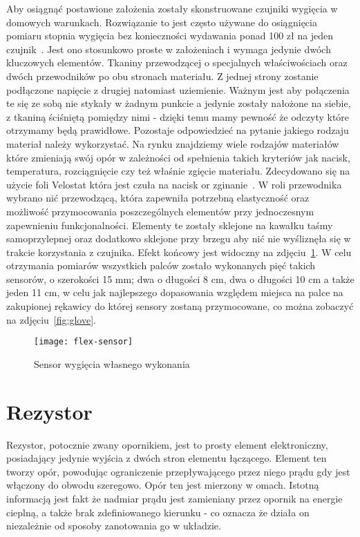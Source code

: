 	Aby osiągnąć postawione założenia zostały skonstruowane czujniki wygięcia w domowych warunkach. Rozwiązanie to jest często używane do osiągnięcia pomiaru stopnia wygięcia bez konieczności wydawania ponad 100 zł na jeden czujnik~\cite{flex-sensor}. Jest ono stosunkowo proste w założeniach i wymaga jedynie dwóch kluczowych elementów. Tkaniny przewodzącej o specjalnych właściwościach oraz dwóch przewodników po obu stronach materiału. Z jednej strony zostanie podłączone napięcie z drugiej natomiast uziemienie. Ważnym jest aby połączenia te się ze sobą nie stykały w żadnym punkcie a jedynie zostały nałożone na siebie, z tkaniną ściśniętą pomiędzy nimi - dzięki temu mamy pewność że odczyty które otrzymamy będą prawidłowe. Pozostaje odpowiedzieć na pytanie jakiego rodzaju materiał należy wykorzystać. Na rynku znajdziemy wiele rodzajów materiałów które zmieniają swój opór w zależności od spełnienia takich kryteriów jak nacisk, temperatura, rozciągnięcie czy też właśnie zgięcie materiału. Zdecydowano się na użycie foli Velostat która jest czuła na nacisk or zginanie~\cite{velostat}. W roli przewodnika wybrano nić przewodzącą, która zapewniła potrzebną elastyczność oraz możliwość przymocowania poszczególnych elementów przy jednoczesnym zapewnieniu funkcjonalności. Elementy te zostały sklejone na kawałku taśmy samoprzylepnej oraz dodatkowo sklejone przy brzegu aby nić nie wyśliznęła się w trakcie korzystania z czujnika. Efekt końcowy jest widoczny na zdjęciu~\ref{fig:sensor}. W celu otrzymania pomiarów wszystkich palców zostało wykonanych pięć takich sensorów, o szerokości 15 mm; dwa o długości 8 cm, dwa o długości 10 cm a także jeden 11 cm, w celu jak najlepszego dopasowania względem miejsca na palce na zakupionej rękawicy do której sensory zostaną przymocowane, co można zobaczyć na zdjęciu~\ref{fig:glove}.
	
\begin{figure}[h]
\centering
\texttt{[image: flex-sensor]}
\caption{Sensor wygięcia własnego wykonania}
\label{fig:sensor}
\end{figure}	

	\section{Rezystor}
	\label{sec:rezystor}	
	Rezystor, potocznie zwany opornikiem, jest to prosty element elektroniczny, posiadający jedynie wyjścia z dwóch stron elementu łączącego. Element ten tworzy opór, powodując ograniczenie przepływającego przez niego prądu gdy jest włączony do obwodu szeregowo. Opór ten jest mierzony w omach. Istotną informacją jest fakt że nadmiar prądu jest zamieniany przez opornik na energie cieplną, a także brak zdefiniowanego kierunku - co oznacza że działa on niezależnie od sposoby zanotowania go w układzie.
	
